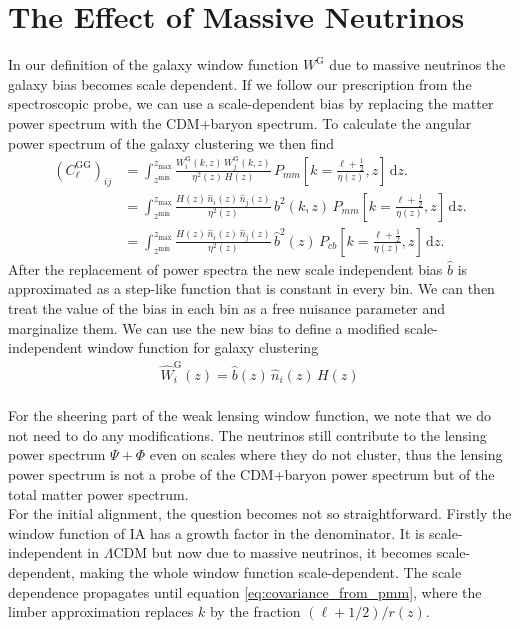 \documentclass[oneside]{book}
\newcommand*{\rd}{\mathrm{d}}
\begin{document}
\section{The Effect of Massive Neutrinos}
In our definition of the galaxy window function $W^\mathrm{G}$ due to massive neutrinos the galaxy bias becomes scale dependent. If we follow our prescription from the spectroscopic probe, we can use a scale-dependent bias by replacing the matter power spectrum with the CDM+baryon spectrum. To calculate the angular power spectrum of the galaxy clustering we then find 
\begin{align}
    \left(C^\mathrm{GG}_{\ell}\right)_{ij} &= \int_{z^\mathrm{min}}^{z_\mathrm{max}} \frac{W_i^\mathrm{G}(k,z) \,  W_j^\mathrm{G}(k,z)}{\eta^2(z)\,H(z)}\,P_{mm}\left[k=\frac{\ell+\frac{1}{2}}{\eta(z)},z\right]\, \rd z. \nonumber \\
    &=\int_{z^\mathrm{min}}^{z_\mathrm{max}} \frac{H(z)\,\hat{n}_i(z)\,\hat{n}_j(z)}{\eta^2(z)}\,b^2(k,z)\,P_{mm}\left[k=\frac{\ell+\frac{1}{2}}{\eta(z)},z\right]\, \rd z. \nonumber \\
    &=\int_{z^\mathrm{min}}^{z_\mathrm{max}} \frac{H(z)\,\hat{n}_i(z)\,\hat{n}_j(z)}{\eta^2(z)}\,\hat{b}^2(z)\,P_{cb}\left[k=\frac{\ell+\frac{1}{2}}{\eta(z)},z\right]\, \rd z. 
\end{align}
After the replacement of power spectra the new scale independent bias $\hat{b}$ is approximated as a step-like function that is constant in every bin. We can then treat the value of the bias in each bin as a free nuisance parameter and marginalize them. We can use the new bias to define a modified scale-independent window function for galaxy clustering\begin{align*}
    \hat{W}^\mathrm{G}_i(z) = \hat{b}(z)\,\hat{n}_i(z)\,H(z)
\end{align*}\\
For the sheering part of the weak lensing window function, we note that we do not need to do any modifications. The neutrinos still contribute to the lensing power spectrum $\Psi+\Phi$ even on scales where they do not cluster, thus the lensing power spectrum is not a probe of the CDM+baryon power spectrum but of the total matter power spectrum.\\
For the initial alignment, the question becomes not so straightforward. Firstly the window function of IA has a growth factor in the denominator. It is scale-independent in $\Lambda$CDM but now due to massive neutrinos, it becomes scale-dependent, making the whole window function scale-dependent. The scale dependence propagates until equation \ref{eq:covariance_from_pmm}, where the limber approximation replaces $k$ by the fraction $(\ell+1/2)/r(z)$.\\
\end{document}
